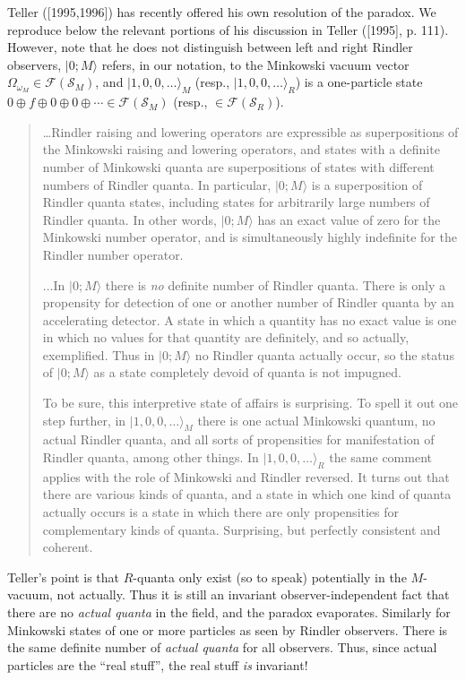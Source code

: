 \documentclass[12pt]{article}
\theoremstyle{remark}
\theoremstyle{definition}
\newcommand{\hil}[1]{\mathcal{#1}}
\begin{document}
 Teller ([1995,1996]) has recently offered his own resolution of 
 the paradox.  We reproduce below the relevant portions of his discussion in Teller ([1995], 
 p. 111).  
 However, note that he does not distinguish between left 
 and right Rindler observers, $|0;M\rangle$ refers, 
in our notation, to the Minkowski vacuum vector 
$\Omega_{\omega_{M}}\in\hil{F}(\hil{S}_{M})$, and 
$|1,0,0,\ldots\rangle_{M}$ (resp., $|1,0,0,\ldots\rangle_{R}$) 
is a one-particle state 
$0\oplus f\oplus 0\oplus 0\oplus\cdots\in\hil{F}(\hil{S}_{M})$  
(resp., $\in\hil{F}(\hil{S}_{R})$).     
\begin{quote}
  \ldots Rindler raising and lowering operators are expressible as
  superpositions of the Minkowski raising and lowering operators, and
  states with a definite number of Minkowski quanta are superpositions
  of states with different numbers of Rindler quanta. In particular,
  $|0;M\rangle$ is a superposition of Rindler quanta states, including
  states for arbitrarily large numbers of Rindler quanta. In other
  words, $|0;M\rangle$ has an exact value of zero for the Minkowski
  number operator, and is simultaneously highly indefinite for the
  Rindler number operator.\smallskip

...In $|0;M\rangle$ there is \textit{no} definite number of Rindler
quanta. There is only a propensity for detection of one or another number of
Rindler quanta by an accelerating detector. A state in which a quantity has
no exact value is one in which no values for that quantity are definitely,
and so actually, exemplified. Thus in $|0;M\rangle$ no Rindler
quanta actually occur, so the status of $|0;M\rangle$ as a state
completely devoid of quanta is not impugned.\smallskip

To be sure, this interpretive state of affairs is surprising.  
To spell it out one step further, in $|1,0,0,\ldots\rangle_{M}$ there is 
one actual Minkowski quantum, no actual Rindler quanta, and all sorts 
of propensities for manifestation of Rindler quanta, among other 
things.   In $|1,0,0,\ldots\rangle_{R}$ the same comment applies with 
the role of Minkowski and Rindler reversed.  It turns out
that there are various kinds of quanta, and a state in which one kind of
quanta actually occurs is a state in which there are only propensities for
complementary kinds of quanta. Surprising, but perfectly consistent and
coherent. 
\end{quote}

\noindent Teller's point is that $R$-quanta only exist (so to speak)
potentially in the $M$-vacuum, not actually.  Thus it is 
still an invariant observer-independent fact that there are no \emph{actual quanta} in 
the field, and the paradox evaporates.  Similarly for Minkowski 
states of one or more particles as seen by Rindler observers.  There 
is the same definite number of \emph{actual quanta} for all observers.  
Thus, since actual particles are the ``real stuff'', the real stuff 
\emph{is} invariant!  
\end{document}
